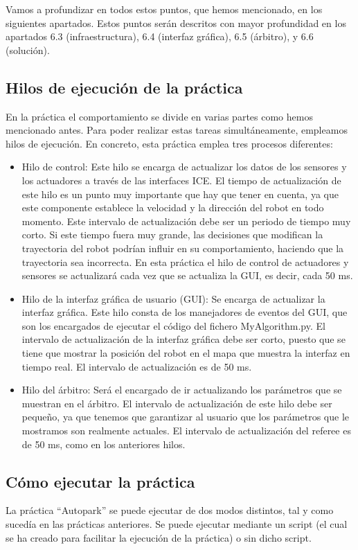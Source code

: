 Vamos a profundizar en todos estos puntos, que hemos mencionado, en los siguientes apartados. Estos puntos serán descritos con mayor profundidad en los apartados 6.3 (infraestructura), 6.4 (interfaz gráfica), 6.5 (árbitro), y 6.6 (solución).\\

\subsection{Hilos de ejecución de la práctica}
En la práctica el comportamiento se divide en varias partes como hemos mencionado antes. Para poder realizar estas tareas simultáneamente, empleamos hilos de ejecución. En concreto, esta práctica emplea tres procesos diferentes:

\begin{itemize}
\item Hilo de control: Este hilo se encarga de actualizar los datos de los sensores y los actuadores a través de las interfaces ICE. El tiempo de actualización de este hilo es un punto muy importante que hay que tener en cuenta, ya que este componente establece la velocidad y la dirección del robot en todo momento. Este intervalo de actualización debe ser un periodo de tiempo muy corto. Si este tiempo fuera muy grande, las decisiones que modifican la trayectoria del robot podrían influir en su comportamiento, haciendo que la trayectoria sea incorrecta. En esta práctica el hilo de control de actuadores y sensores se actualizará cada vez que se actualiza la GUI, es decir, cada 50 ms.
\item Hilo de la interfaz gráfica de usuario (GUI): Se encarga de actualizar la interfaz gráfica. Este hilo consta de los manejadores de eventos del GUI, que son los encargados de ejecutar el código del fichero MyAlgorithm.py. El intervalo de actualización de la interfaz gráfica debe ser corto, puesto que se tiene que mostrar la posición del robot en el mapa que muestra la interfaz en tiempo real. El intervalo de actualización es de 50 ms.
\item Hilo del árbitro: Será el encargado de ir actualizando los parámetros que se muestran en el árbitro. El intervalo de actualización de este hilo debe ser pequeño, ya que tenemos que garantizar al usuario que los parámetros que le mostramos son realmente actuales. El intervalo de actualización del referee es de 50 ms, como en los anteriores hilos.
\end{itemize}

\subsection{Cómo ejecutar la práctica}
La práctica ``Autopark'' se puede ejecutar de dos modos distintos, tal y como sucedía en las prácticas anteriores. Se puede ejecutar mediante un script (el cual se ha creado para facilitar la ejecución de la práctica) o sin dicho script.\\

